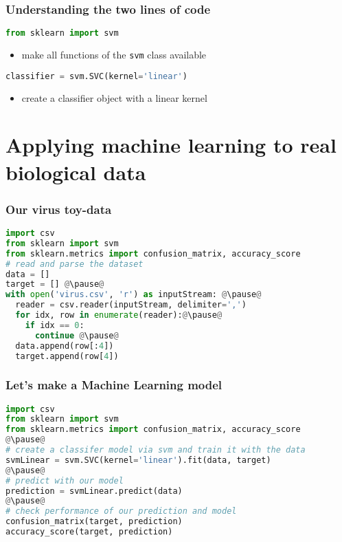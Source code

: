 \begin{frame}[c,fragile]\frametitle{Understanding the two lines of code}

  \begin{lstlisting}[language=Python]
from sklearn import svm
  \end{lstlisting}
  \begin{itemize}
    \item {\small make all functions of the \texttt{svm} class available}
  \end{itemize}
  
\pause
  \begin{lstlisting}[language=Python]
classifier = svm.SVC(kernel='linear')
  \end{lstlisting}
  \begin{itemize}
    \item {\small create a classifier object with a linear kernel}
  \end{itemize}

\end{frame}

\section[Virus data]{Applying machine learning to real biological data}

\begin{frame}[c, fragile]\frametitle{Our virus toy-data}

  \begin{lstlisting}[language=Python]
import csv
from sklearn import svm
from sklearn.metrics import confusion_matrix, accuracy_score
# read and parse the dataset
data = [] 
target = [] @\pause@ 
with open('virus.csv', 'r') as inputStream: @\pause@
  reader = csv.reader(inputStream, delimiter=',') 
  for idx, row in enumerate(reader):@\pause@ 
    if idx == 0: 
      continue @\pause@
  data.append(row[:4]) 
  target.append(row[4]) 
  \end{lstlisting}
\end{frame}

\begin{frame}[c, fragile]\frametitle{Let's make a Machine Learning model}
\begin{lstlisting}[language=Python]
import csv
from sklearn import svm
from sklearn.metrics import confusion_matrix, accuracy_score
@\pause@
# create a classifer model via svm and train it with the data
svmLinear = svm.SVC(kernel='linear').fit(data, target)
@\pause@
# predict with our model
prediction = svmLinear.predict(data)
@\pause@
# check performance of our prediction and model
confusion_matrix(target, prediction)
accuracy_score(target, prediction)
\end{lstlisting}
\end{frame}


